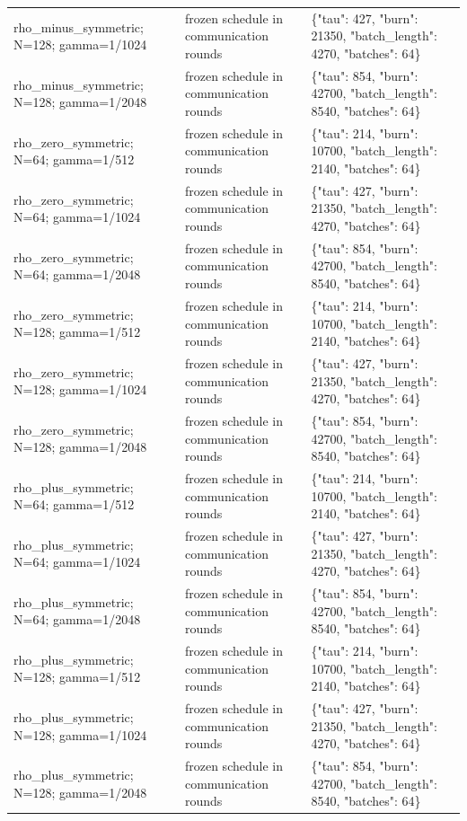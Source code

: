 \begin{tabular}{lll}
rho\_minus\_symmetric; N=128; gamma=1/1024 & frozen schedule in communication rounds & \{"tau": 427, "burn": 21350, "batch\_length": 4270, "batches": 64\} \\
rho\_minus\_symmetric; N=128; gamma=1/2048 & frozen schedule in communication rounds & \{"tau": 854, "burn": 42700, "batch\_length": 8540, "batches": 64\} \\
rho\_zero\_symmetric; N=64; gamma=1/512 & frozen schedule in communication rounds & \{"tau": 214, "burn": 10700, "batch\_length": 2140, "batches": 64\} \\
rho\_zero\_symmetric; N=64; gamma=1/1024 & frozen schedule in communication rounds & \{"tau": 427, "burn": 21350, "batch\_length": 4270, "batches": 64\} \\
rho\_zero\_symmetric; N=64; gamma=1/2048 & frozen schedule in communication rounds & \{"tau": 854, "burn": 42700, "batch\_length": 8540, "batches": 64\} \\
rho\_zero\_symmetric; N=128; gamma=1/512 & frozen schedule in communication rounds & \{"tau": 214, "burn": 10700, "batch\_length": 2140, "batches": 64\} \\
rho\_zero\_symmetric; N=128; gamma=1/1024 & frozen schedule in communication rounds & \{"tau": 427, "burn": 21350, "batch\_length": 4270, "batches": 64\} \\
rho\_zero\_symmetric; N=128; gamma=1/2048 & frozen schedule in communication rounds & \{"tau": 854, "burn": 42700, "batch\_length": 8540, "batches": 64\} \\
rho\_plus\_symmetric; N=64; gamma=1/512 & frozen schedule in communication rounds & \{"tau": 214, "burn": 10700, "batch\_length": 2140, "batches": 64\} \\
rho\_plus\_symmetric; N=64; gamma=1/1024 & frozen schedule in communication rounds & \{"tau": 427, "burn": 21350, "batch\_length": 4270, "batches": 64\} \\
rho\_plus\_symmetric; N=64; gamma=1/2048 & frozen schedule in communication rounds & \{"tau": 854, "burn": 42700, "batch\_length": 8540, "batches": 64\} \\
rho\_plus\_symmetric; N=128; gamma=1/512 & frozen schedule in communication rounds & \{"tau": 214, "burn": 10700, "batch\_length": 2140, "batches": 64\} \\
rho\_plus\_symmetric; N=128; gamma=1/1024 & frozen schedule in communication rounds & \{"tau": 427, "burn": 21350, "batch\_length": 4270, "batches": 64\} \\
rho\_plus\_symmetric; N=128; gamma=1/2048 & frozen schedule in communication rounds & \{"tau": 854, "burn": 42700, "batch\_length": 8540, "batches": 64\} \\

\end{tabular}
